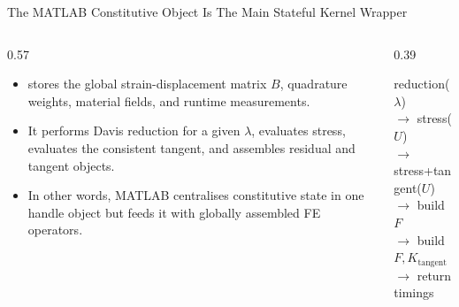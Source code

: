 \documentclass[aspectratio=169,10pt]{beamer}
\begin{document}
\begin{frame}{The MATLAB Constitutive Object Is The Main Stateful Kernel Wrapper}
\small
\begin{columns}[T,totalwidth=\textwidth]
\begin{column}{0.57\textwidth}
\begin{softbox}
\begin{itemize}
  \item {} stores the global strain-displacement matrix \(B\), quadrature weights, material fields, and runtime measurements.
  \item It performs Davis reduction for a given \(\lambda\), evaluates stress, evaluates the consistent tangent, and assembles residual and tangent objects.
  \item In other words, MATLAB centralises constitutive state in one handle object but feeds it with globally assembled FE operators.
\end{itemize}
\end{softbox}
\end{column}
\begin{column}{0.39\textwidth}
\begin{pseudobox}
reduction($\lambda$)\\
$\rightarrow$ stress(\(U\))\\
$\rightarrow$ stress+tangent(\(U\))\\
$\rightarrow$ build \(F\)\\
$\rightarrow$ build \(F, K_{\text{tangent}}\)\\
$\rightarrow$ return timings
\end{pseudobox}
\end{column}
\end{columns}
\end{frame}
\end{document}
